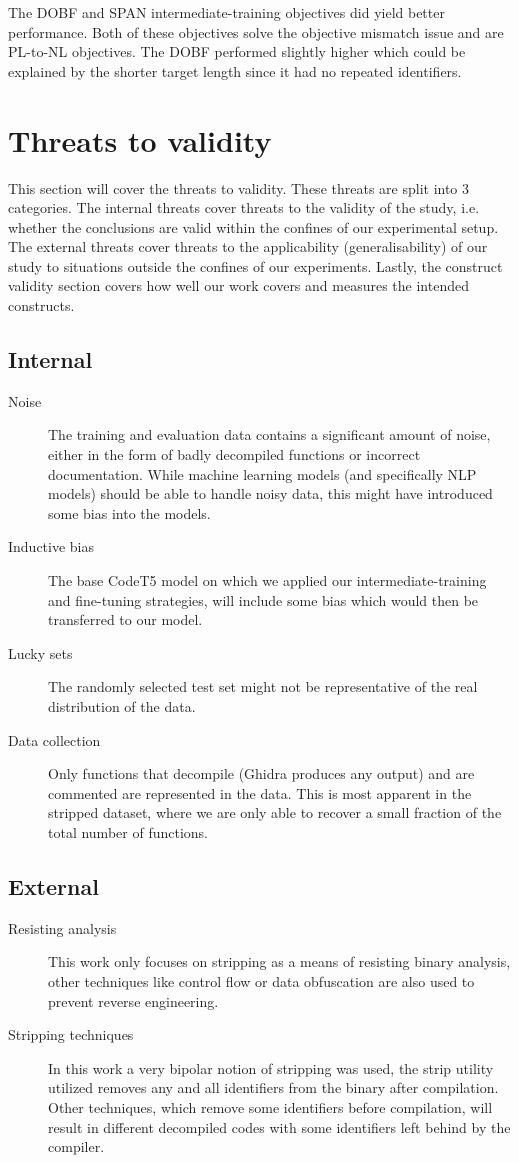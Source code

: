 The DOBF and SPAN intermediate-training objectives did yield better performance. Both of these objectives solve the objective mismatch issue and are PL-to-NL objectives. The DOBF performed slightly higher which could be explained by the shorter target length since it had no repeated identifiers.

\section{Threats to validity}

This section will cover the threats to validity. These threats are split into 3 categories. The internal threats cover threats to the validity of the study, i.e. whether the conclusions are valid within the confines of our experimental setup. The external threats cover threats to the applicability (generalisability) of our study to situations outside the confines of our experiments. Lastly, the construct validity section covers how well our work covers and measures the intended constructs.
\subsection{Internal}
    \begin{description}
        \item[Noise] The training and evaluation data contains a significant amount of noise, either in the form of badly decompiled functions or incorrect documentation. While machine learning models (and specifically NLP models) should be able to handle noisy data, this might have introduced some bias into the models.
        \item[Inductive bias] The base CodeT5 model on which we applied our intermediate-training and fine-tuning strategies, will include some bias which would then be transferred to our model.
        \item[Lucky sets] The randomly selected test set might not be representative of the real distribution of the data.
        \item[Data collection] Only functions that decompile (Ghidra produces any output) and are commented are represented in the data. This is most apparent in the stripped dataset, where we are only able to recover a small fraction of the total number of functions. 
    \end{description}
\subsection{External}
    \begin{description}
        \item[Resisting analysis] This work only focuses on stripping as a means of resisting binary analysis, other techniques like control flow or data obfuscation are also used to prevent reverse engineering. 
        \item[Stripping techniques] In this work a very bipolar notion of stripping was used, the strip utility utilized removes any and all identifiers from the binary after compilation. Other techniques, which remove some identifiers before compilation, will result in different decompiled codes with some identifiers left behind by the compiler. 
    \end{description}
